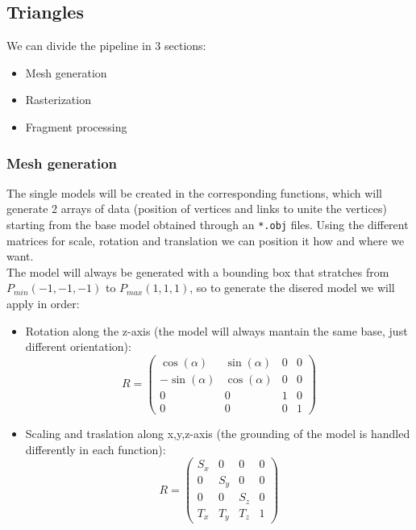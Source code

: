 \documentclass{article}
\begin{document}
\newpage

\subsection{Triangles}\label{subsec:Triangles}

We can divide the pipeline in 3 sections:

\begin{itemize}
    \item Mesh generation
    \item Rasterization
    \item Fragment processing 
\end{itemize}

\subsubsection{Mesh generation}

The single models will be created in the corresponding functions, which will generate 2 arrays of data (position of vertices and links to unite the vertices) starting from the base model obtained through an \texttt{*.obj} files. Using the different matrices for scale, rotation and translation we can position it how and where we want. 
\\[.5cm]
The model will always be generated with a bounding box that stratches from $P_{min}(-1,-1,-1)$ to $P_{max}(1,1,1)$, so to generate the disered model we will apply in order:

\begin{itemize}
    \item Rotation along the z-axis (the model will always mantain the same base, just different orientation):
    $$R = \begin{pmatrix} \cos(\alpha) & \sin(\alpha) & 0 & 0 \\ -\sin(\alpha) & \cos(\alpha) & 0 & 0 \\ 0 & 0 & 1 & 0 \\ 0 & 0 & 0 & 1 \end{pmatrix}$$

    \item Scaling and traslation along x,y,z-axis (the grounding of the model is handled differently in each function): 
    $$R = \begin{pmatrix} S_x & 0 & 0 & 0 \\ 0 & S_y & 0 & 0 \\ 0 & 0 & S_z & 0 \\ T_x & T_y & T_z & 1 \end{pmatrix}$$

\end{itemize}
\end{document}
